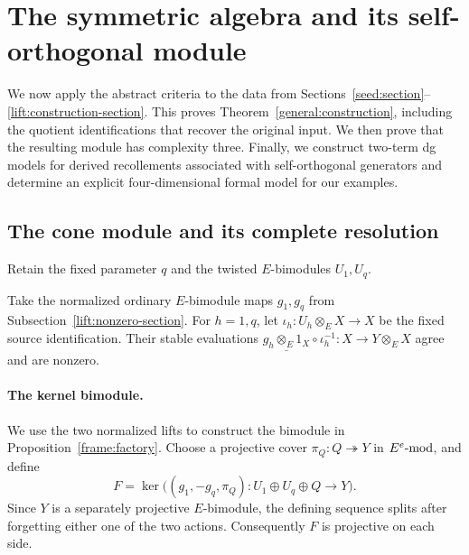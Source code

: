 \documentclass[11pt]{article}
\begin{document}
\section{The symmetric algebra and its self-orthogonal module}
\label{app:section}

We now apply the abstract criteria to the data from
Sections~\ref{seed:section}--\ref{lift:construction-section}. This
proves Theorem~\ref{general:construction}, including the quotient
identifications that recover the original input. We then prove that
the resulting module has complexity three. Finally, we construct
two-term dg models for derived recollements associated with
self-orthogonal generators and determine an explicit four-dimensional
formal model for our examples.

\subsection{The cone module and its complete resolution}
Retain the fixed parameter $q$ and the twisted $E$-bimodules $U_1,U_q$.

Take the normalized ordinary $E$-bimodule maps $g_1,g_q$ from
Subsection~\ref{lift:nonzero-section}. For $h=1,q$, let
$\iota_h:U_h\otimes_E X\to X$ be the fixed source
identification. Their stable evaluations
$\underline{g_h\otimes_E1_X}\circ\iota_h^{-1}: X\to Y\otimes_EX$ agree and are nonzero.

\paragraph{The kernel bimodule.}
We use the two normalized lifts to construct the bimodule in
Proposition~\ref{frame:factory}. Choose a projective cover
$\pi_Q:Q\twoheadrightarrow Y$ in $E^e\mbox{{\rm -mod}}$, and define
\begin{equation}\label{app:F}
 F=\ker\bigl((g_1,-g_q,\pi_Q):U_1\oplus U_q\oplus Q\to Y\bigr).
\end{equation}
Since $Y$ is a separately projective $E$-bimodule, the
defining sequence splits after forgetting either one of the two
actions. Consequently $F$ is projective on each side.
\end{document}
